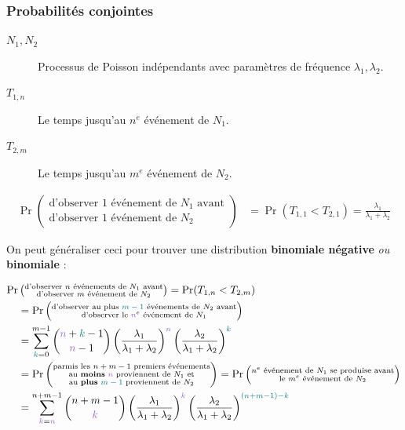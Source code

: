 \documentclass[french]{article}
\begin{document}
\begin{multicols*}{2}
\columnbreak
\subsubsection{Probabilités conjointes}
\begin{distributions}[Notation]
\begin{description}
	\item[$N_{1}, N_{2}$]	Processus de Poisson indépendants avec paramètres de fréquence $\lambda_{1}, \lambda_{2}$.
	\item[$T_{1, n}$]	Le temps jusqu'au $n^{e}$ événement de $N_{1}$.
	\item[$T_{2, m}$]	Le temps jusqu'au $m^{e}$ événement de $N_{2}$.
\end{description}
\end{distributions}

\begin{align*}
	\Pr\left(\substack{\text{d'observer 1 événement de $N_{1}$ avant}\\ \text{d'observer 1 événement de $N_{2}$}}\right)
	&=	\Pr(T_{1, 1}	 < T_{2, 1})
	=	\frac{\lambda_{1}}{\lambda_{1} + \lambda_{2}}
\end{align*}

On peut généraliser ceci pour trouver une distribution \textbf{binomiale négative} \textit{ou} \textbf{binomiale} :

\begin{align*}
	\Pr&\left(\substack{
			\text{d'observer $n$ événements de $N_{1}$ avant}\\ 
			\text{d'observer $m$ événement de $N_{2}$}}
		\right)
	=	\Pr(T_{1, n}	 < T_{2, m})	\\
	&=	\Pr\left(\substack{
			\text{d'observer au plus $\textcolor{teal}{m - 1}$ événements de $N_{2}$ avant}\\
			\text{d'observer le $\textcolor{amethyst}{n}^{e}$ événement de $N_{1}$}}
		\right)	\\
	&=	\sum_{\textcolor{teal}{k} = 0}^{m - 1}
			\binom{\textcolor{amethyst}{n} + \textcolor{teal}{k} - 1}{\textcolor{amethyst}{n} - 1}
			\left(\frac{\lambda_{1}}{\lambda_{1} + \lambda_{2}}\right)^{\textcolor{amethyst}{n}}
			\left(\frac{\lambda_{2}}{\lambda_{1} + \lambda_{2}}\right)^{\textcolor{teal}{k}}	\\
	&=	\Pr\left(\substack{
			\text{parmis les $n + m - 1$ premiers événements}\\ 
			\text{au \textbf{moins} $\textcolor{amethyst}{n}$ proviennent de $N_{1}$ et}\\ 
			\text{au \textbf{plus} $\textcolor{teal}{m - 1}$ proviennent de $N_{2}$}}
		\right)	
	=	\Pr\left(\substack{
			\text{$n^{e}$ événement de $N_{1}$ se produise avant}\\ 
			\text{le $m^{e}$ événement de $N_{2}$}}
		\right)	\\
	&=	\sum_{\textcolor{amethyst}{k} = \textcolor{amethyst}{n}}^{n + m - 1}
			\binom{n + m - 1}{\textcolor{amethyst}{k}} 
			\left(\frac{\lambda_{1}}{\lambda_{1} + \lambda_{2}}\right)^{\textcolor{amethyst}{k}} 
			\left(\frac{\lambda_{2}}{\lambda_{1} + \lambda_{2}}\right)^{\textcolor{teal}{(n + m - 1) - k}}	\\
\end{align*}


\end{multicols*}
\end{document}
